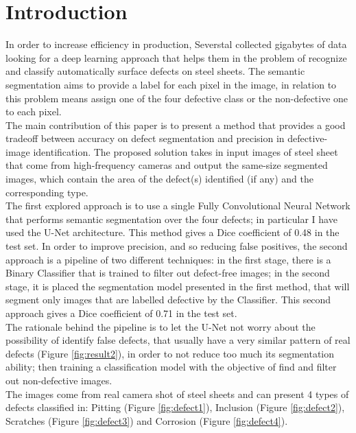 \documentclass[10pt,twocolumn,letterpaper]{article}
\begin{document}
\section{Introduction}
   In order to increase efficiency in production, Severstal collected gigabytes of data looking for a deep learning approach that helps them in the problem of recognize and classify automatically surface defects on steel sheets. The semantic segmentation aims to provide a label for each pixel in the image, in relation to this problem means assign one of the four defective class or the non-defective one to each pixel.\\
   The main contribution of this paper is to present a method that provides a good tradeoff between accuracy on defect segmentation and precision in defective-image identification. The proposed solution takes in input images of steel sheet that come from high-frequency cameras and output the same-size segmented images, which contain the area of the defect(s) identified (if any) and the corresponding type. \\
   The first explored approach is to use a single Fully Convolutional Neural Network that performs semantic segmentation over the four defects; in particular I have used the U-Net architecture. This method gives a Dice coefficient of 0.48 in the test set.
   In order to improve precision, and so reducing false positives, the second approach is a pipeline of two different techniques: in the first stage, there is a Binary Classifier that is trained to filter out defect-free images; in the second stage, it is placed the segmentation model presented in the first method, that will segment only images that are labelled defective by the Classifier. This second approach gives a Dice coefficient of 0.71 in the test set.\\ 
   The rationale behind the pipeline is to let the U-Net not worry about the possibility of identify false defects, that usually have a very similar pattern of real defects (Figure \ref{fig:result2}), in order to not reduce too much its segmentation ability; then training a classification model with the objective of find and filter out non-defective images.\\
   The images come from real camera shot of steel sheets and can present 4 types of defects classified in: Pitting (Figure \ref{fig:defect1}), Inclusion (Figure \ref{fig:defect2}), Scratches (Figure \ref{fig:defect3}) and Corrosion (Figure \ref{fig:defect4}).
   
\end{document}
